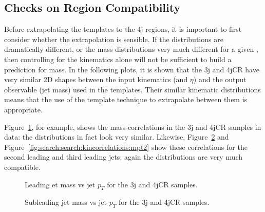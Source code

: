 \subsection{Checks on Region Compatibility}

Before extrapolating the templates to the 4j regions, it is important to first consider whether the extrapolation is sensible. If the \pt distributions are dramatically different, or the mass distributions very much different for a given \pt, then controlling for the kinematics alone will not be sufficient to build a prediction for mass. In the following plots, it is shown that the 3j and 4jCR have very similar 2D shapes between the input kinematics (\pt and $\eta$) and the output observable (jet mass) used in the templates. Their similar kinematic distributions means that the use of the template technique to extrapolate between them is appropriate.


Figure~\ref{fig:search:search:kincorrelations:mpt0}, for example, shows the mass-\pt correlations in the 3j and 4jCR samples in data: the distributions in fact look very similar. Likewise, Figure~\ref{fig:search:search:kincorrelations:mpt1} and Figure~\ref{fig:search:search:kincorrelations:mpt2} show these correlations for the second leading and third leading jets; again the distributions are very much compatible.

\begin{figure}[!ht]
  \centering
  

    
  \caption{Leading et mass vs jet $p_T$ for the 3j and 4jCR samples.}
           
  \label{fig:search:search:kincorrelations:mpt0}
\end{figure}

\begin{figure}[!ht]
  \centering
  

    
  \caption{Subleading jet mass vs jet $p_T$ for the 3j and 4jCR samples.}
           
  \label{fig:search:search:kincorrelations:mpt1}
\end{figure}


